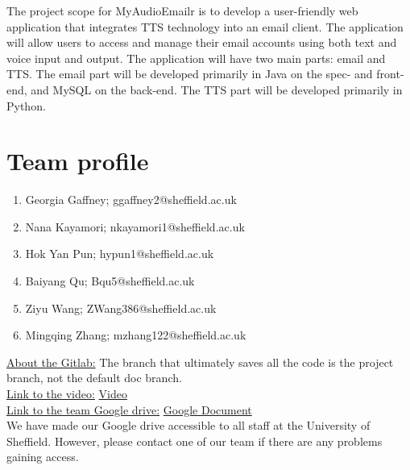 \documentclass{article}
\begin{document}
The project scope for MyAudioEmailr is to develop a user-friendly web application that integrates TTS technology into an email client. The application will allow users to access and manage their email accounts using both text and voice input and output. The application will have two main parts: email and TTS. The email part will be developed primarily in Java on the spec- and front-end, and MySQL on the back-end. The TTS part will be developed primarily in Python.


\section{Team profile}
\begin{enumerate}
  \item Georgia Gaffney; ggaffney2@sheffield.ac.uk
  \item Nana Kayamori; nkayamori1@sheffield.ac.uk
  \item Hok Yan Pun; hypun1@sheffield.ac.uk
  \item Baiyang Qu; Bqu5@sheffield.ac.uk
  \item Ziyu Wang; ZWang386@sheffield.ac.uk
  \item Mingqing Zhang; mzhang122@sheffield.ac.uk
\end{enumerate}
\underline{About the Gitlab:} The branch that ultimately saves all the code is the project branch, not the default doc branch. 
\\
\underline{Link to the video:}
\href{https://git.shefcompsci.org.uk/com6103-2022-23/team02/project/-/blob/project/video/MyAudioEmailr%20(Team%202).mp4}{Video}
\\
\underline{Link to the team Google drive:}
\href{https://drive.google.com/drive/folders/1L\_B7ax4ZjqrkdyzbJagLgAt-GhVxp-QS?usp=sharing}{Google Document}
\\
We have made our Google drive accessible to all staff at the University of Sheffield. However, please contact one of our team if there are any problems gaining access.
\end{document}
